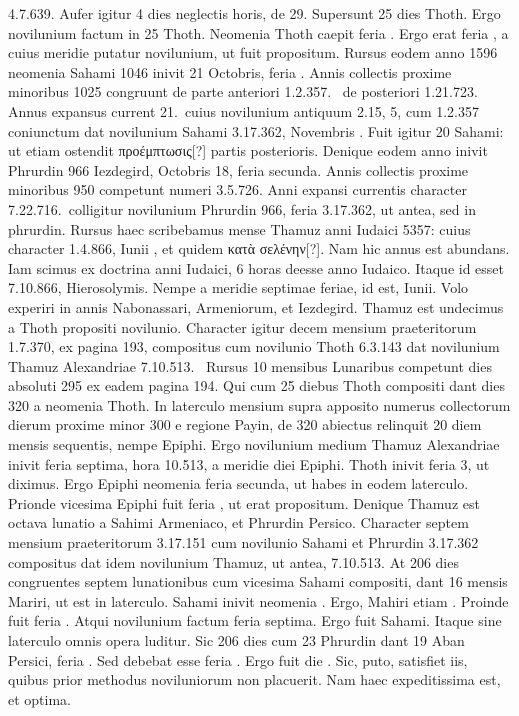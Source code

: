 4.7.639.
Aufer igitur 4 dies neglectis horis, de 29.
Supersunt 25 dies Thoth.
Ergo novilunium factum in 25 Thoth.
Neomenia Thoth caepit feria .
Ergo  erat feria , a cuius
meridie putatur novilunium, ut fuit propositum.
Rursus eodem anno
1596 neomenia Sahami 1046 inivit 21 Octobris, feria .
Annis
collectis proxime minoribus 1025 congruunt de parte anteriori 1.2.357.\ %
de posteriori 1.21.723.
Annus expansus current 21.\ cuius novilunium
antiquum 2.15, 5, cum 1.2.357 coniunctum dat novilunium
Sahami 3.17.362, Novembris .
Fuit igitur 20 Sahami: ut
etiam ostendit \textgreek{προέμπτωσις}[?] partis posterioris.
Denique eodem anno
inivit Phrurdin 966 Iezdegird, Octobris 18, feria secunda.
Annis
collectis proxime minoribus 950 competunt numeri 3.5.726.
Anni
expansi currentis character 7.22.716.\ colligitur novilunium Phrurdin
966, feria 3.17.362, ut antea, sed in  phrurdin.
Rursus
haec scribebamus mense Thamuz anni Iudaici 5357: cuius character
1.4.866, Iunii , et quidem \textgreek{κατὰ σελένην}[?].
Nam hic annus
est abundans.
Iam scimus ex doctrina anni Iudaici, 6 horas deesse
anno Iudaico.
Itaque id esset 7.10.866, Hierosolymis.
Nempe a
meridie septimae feriae, id est,  Iunii.
Volo experiri in annis Nabonassari,
Armeniorum, et Iezdegird.
%
Thamuz est undecimus a Thoth
propositi novilunio.
Character igitur decem mensium praeteritorum
1.7.370, ex pagina 193, compositus cum novilunio Thoth 6.3.143
dat novilunium Thamuz Alexandriae 7.10.513.\ %
Rursus 10 mensibus
Lunaribus competunt dies absoluti 295 ex eadem pagina 194.
Qui
cum 25 diebus Thoth compositi dant dies 320 a neomenia Thoth.
%
In laterculo mensium supra apposito numerus collectorum dierum
proxime minor 300 e regione Payin, de 320 abiectus relinquit 20
diem mensis sequentis, nempe Epiphi.
Ergo novilunium medium
Thamuz Alexandriae inivit feria septima, hora 10.513, a meridie 
diei Epiphi.
Thoth inivit feria 3, ut diximus.
Ergo Epiphi neomenia
feria secunda, ut habes in eodem laterculo. %
Prionde vicesima Epiphi
fuit feria , ut erat propositum.
Denique Thamuz est octava lunatio
a Sahimi Armeniaco, et Phrurdin Persico.
Character septem mensium
praeteritorum 3.17.151 cum novilunio Sahami et Phrurdin 3.17.362
compositus dat idem novilunium Thamuz, ut antea, 7.10.513.
At 206 dies congruentes septem lunationibus cum vicesima Sahami
compositi, dant 16 mensis Mariri, ut est in laterculo.
Sahami inivit
neomenia .
Ergo, Mahiri etiam .
Proinde  fuit feria .
Atqui novilunium factum feria septima.
Ergo fuit  Sahami.
Itaque
sine laterculo omnis opera luditur.
Sic 206 dies cum 23 Phrurdin
dant 19 Aban Persici, feria .
Sed debebat esse feria .
Ergo fuit
die .
Sic, puto, satisfiet iis, quibus prior methodus noviluniorum
non placuerit.
Nam haec expeditissima est, et optima.
%
